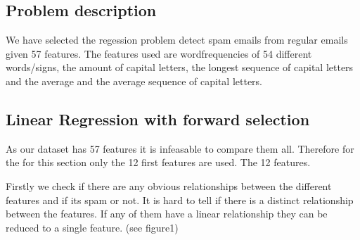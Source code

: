 \documentclass[11pt, paper=a4]{article}
\begin{document}
\subsection{Problem description}
We have selected the regession problem detect spam emails from regular
emails given 57 features.  The features used are wordfrequencies of 54
different words/signs, the amount of capital letters, the longest
sequence of capital letters and the average and the average sequence
of capital letters.

\subsection{Linear Regression with forward selection}
As our dataset has 57 features it is infeasable to compare them all.
Therefore for the for this section only the 12 first features are used.
The 12 features.

Firstly we check if there are any obvious relationships between the
different features and if its spam or not. It is hard to tell if there
is a distinct relationship between the features. If any of them have a
linear relationship they can be reduced to a single feature. (see figure1)
\end{document}
